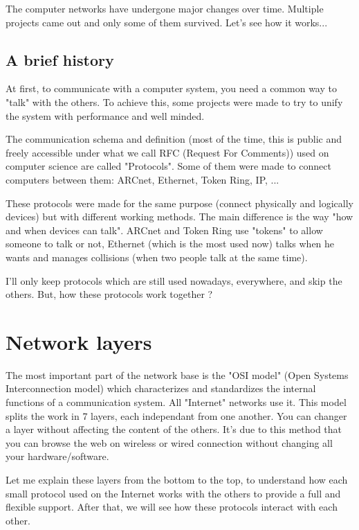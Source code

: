 \documentclass{article}
\begin{document}
	The computer networks have undergone major changes over time. Multiple projects came out and
	only some of them survived. Let's see how it works...
	
	\subsection{A brief history}
	
	At first, to communicate with a computer system, you need a common way to "talk" with the others. To achieve
	this, some projects were made to try to unify the system with performance and well minded.
	
	The communication schema and definition (most of the time, this is public and freely accessible under what we
	call RFC (Request For Comments)) used on computer science are called "Protocols".
	Some of them were made to connect computers between them: ARCnet, Ethernet, Token Ring, IP, ...
	
	These protocols were made for the same purpose (connect physically and logically devices) but with different
	working methods. The main difference is the way "how and when devices can talk".
	ARCnet and Token Ring use "tokens" to allow someone to talk or not, Ethernet (which is the most used now)
	talks when he wants and manages collisions (when two people talk at the same time).
	
	I'll only keep protocols which are still used nowadays, everywhere, and skip the others.
	But, how these protocols work together ?

\section{Network layers}

	The most important part of the network base is the "OSI model" (Open Systems Interconnection model) which characterizes and
	standardizes the internal functions of a communication system. All "Internet" networks use it. This model splits
	the work in 7 layers, each independant from one another. You can changer a layer without affecting the content
	of the others. It's due to this method that you can browse the web on wireless or wired connection without changing
	all your hardware/software.
	
	Let me explain these layers from the bottom to the top, to understand how each small protocol used on the Internet
	works with the others to provide a full and flexible support. After that, we will see how these protocols interact
	with each other.
	
\end{document}

